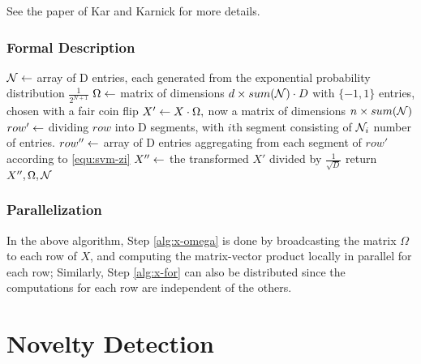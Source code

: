See the paper of Kar and Karnick \cite{KK12} for more details.

\subsubsection{Formal Description}

\begin{algorithm}
\begin{algorithmic}[1]
	\State ${\cal N} \leftarrow $ array of D entries, each generated from the exponential probability distribution $\frac{1}{2^{N+1}}$
	\State $\Omega \leftarrow $ matrix of dimensions $d\times sum({\cal N}) \cdot D$ with $\{-1,1\}$ entries, chosen with a fair coin flip
	\State $X'\leftarrow X\cdot \Omega,$ now a matrix of dimensions $n \times sum({\cal N})$
	\label{alg:x-omega}
	\label{alg:x-for}
		\State $row' \leftarrow $ dividing $row$ into D segments, with $i$th segment consisting of ${\cal N}_i$ number of entries.
		\State $row'' \leftarrow $ array of D entries aggregating from each segment of $row'$ according to \eqref{equ:svm-zi}
	\EndFor
	\State $X'' \leftarrow $ the transformed $X'$ divided by $\frac{1}{\sqrt{D}}$
	\State return $X'',\Omega, {\cal N}$
\end{algorithmic}
\end{algorithm}

\subsubsection{Parallelization}
In the above algorithm, Step \ref{alg:x-omega} is done by broadcasting the
matrix $\Omega$ to each row of $X$, and computing the matrix-vector product
locally in parallel for each row; Similarly, Step \ref{alg:x-for} can also be
distributed since the computations for each row are independent of the others.

\section{Novelty Detection}

